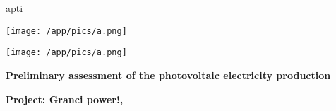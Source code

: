 apti     \documentclass[10pt,a4paper,UTF8]{article}
\begin{document}
\begin{titlepage}
	\raggedright
	\texttt{[image: /app/pics/a.png]}
	\par
%	
	\vspace{2cm}
	\hspace*{-0.08\textwidth}\texttt{[image: /app/pics/a.png]}\par
	\vspace{1cm}
    {\huge\bfseries\color{sg_orange} Preliminary assessment of the photovoltaic electricity production \par}
	\vspace{1cm}
	{\large\bfseries\color{sg_orange} Project: Granci power!,  \par}



\end{titlepage}
\end{document}
